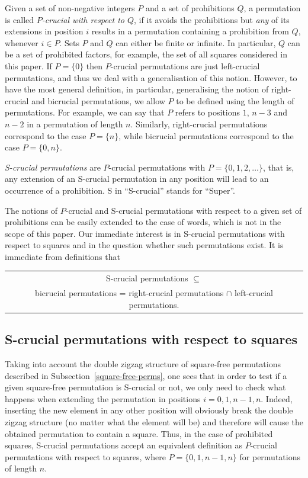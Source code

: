 \documentclass[12pt,reqno]{article}
\begin{document}
Given a set of non-negative integers $P$ and a set of prohibitions $Q$, a permutation is called {\em $P$-crucial with respect to $Q$}, if it avoids the prohibitions but {\em any} of its extensions in position $i$ results in a permutation containing a prohibition from $Q$, whenever $i\in P$. Sets $P$ and $Q$ can either be finite or infinite. In particular, $Q$ can be a set of prohibited factors, for example, the set of all squares considered in this paper.  If $P=\{0\}$ then $P$-crucial permutations are just left-crucial permutations, and thus we deal with a generalisation of this notion. However, to have the most general definition, in particular, generalising the notion of right-crucial and bicrucial permutations, we allow $P$ to be defined using the length of permutations. For example, we can say that $P$ refers to positions $1$, $n-3$ and $n-2$ in a permutation of length $n$. Similarly, right-crucial permutations correspond to the case $P=\{n\}$, while bicrucial permutations correspond to the case $P=\{0,n\}$.

{\em S-crucial permutations} are $P$-crucial permutations with $P=\{0,1,2,\ldots\}$, that is, any extension of an S-crucial permutation in any position will lead to an occurrence of a prohibition. S in ``S-crucial'' stands for ``Super''. 

The notions of $P$-crucial and S-crucial permutations with respect to a given set of prohibitions can be easily extended to  the case of words, which is not in the scope of this paper. Our immediate interest is in S-crucial  permutations with respect to squares and in the question whether such permutations exist. It is immediate from definitions that 

\begin{center}
\begin{tabular}{c}
S-crucial permutations  $\subseteq$ \\
bicrucial permutations  = right-crucial permutations $\cap$ left-crucial permutations.
\end{tabular}
\end{center}

\subsection{S-crucial permutations with respect to squares}\label{sub-S-crucial}

Taking into account the double zigzag structure of square-free permutations described in Subsection~\ref{square-free-perms}, one sees that in order to test if a given square-free permutation is S-crucial or not, we only need to check what happens when extending the permutation in positions $i=0,1,n-1,n$. Indeed, inserting the new element in any other position will obviously break the double zigzag structure (no matter what the element will be) and therefore will cause the obtained permutation to contain a square.  Thus, in the case of prohibited squares, S-crucial permutations accept an equivalent definition as $P$-crucial permutations with respect to squares, where $P=\{0,1,n-1,n\}$ for permutations of length $n$.   
\end{document}

